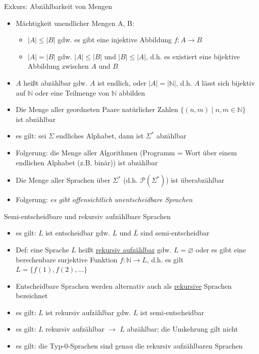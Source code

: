 \begin{frame}{Exkurs: Abzählbarkeit von Mengen}
	\begin{itemize}
		\item Mächtigkeit unendlicher Mengen A, B:
		\begin{itemize}
			\item $|A|\leq |B|$ gdw. es gibt eine injektive Abbildung $f: A \rightarrow B$
			\item $|A| = |B|$ gdw. $|A|\leq |B|$ und $|B|\leq |A|$, d.h. es existiert eine bijektive Abbildung zwischen $A$ und $B$
		\end{itemize}
		\item $A$ heißt abzählbar gdw. $A$ ist endlich, oder $|A|=|\mathbb{N}|$, d.h. $A$ lässt sich bijektiv auf $\mathbb{N}$ oder eine Teilmenge von $\mathbb{N}$ abbilden
		\item Die Menge aller geordneten Paare natürlicher Zahlen $\{(n,m)\mid n, m \in \mathbb{N}\}$ ist abzählbar
		\item es gilt: sei $\Sigma$ endliches Alphabet, dann ist $\Sigma^*$ abzählbar
		\item Folgerung: die Menge aller Algorithmen (Programm = Wort über einem endlichen Alphabet (z.B. binär)) ist abzählbar
		\item Die Menge aller Sprachen über $\Sigma^*$ (d.h. $\mathcal{P}(\Sigma^*)$) ist überabzählbar
		\item Folgerung: \emph{es gibt offensichtlich unentscheidbare Sprachen}
	\end{itemize}
\end{frame}

\begin{frame}{Semi-entscheidbare und rekursiv aufzählbare Sprachen}
	\begin{itemize}
		\item es gilt: $L$ ist entscheidbar gdw. $L$ und $\overline{L}$ sind semi-entscheidbar
		\item Def: eine Sprache $L$ heißt \underline{rekursiv aufzählbar} gdw. $L=\varnothing$ oder es gibt eine berechenbare surjektive Funktion $f: \mathbb{N} \rightarrow L$, d.h. es gilt $L=\{f(1), f(2), \ldots\}$
		\item Entscheidbare Sprachen werden alternativ auch als \underline{rekursive} Sprachen bezeichnet
		\item es gilt: $L$ ist rekursiv aufzählbar gdw. $L$ ist semi-entscheidbar
		\item es gilt: $L$ rekursiv aufzählbar $\rightarrow$ $L$ abzählbar; die Umkehrung gilt nicht
		\item es gilt: die Typ-0-Sprachen sind genau die rekursiv aufzählbaren Sprachen
	\end{itemize}
\end{frame}

